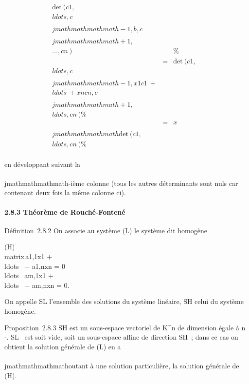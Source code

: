 \begin{align*}
\mathrm{det}~
(c1,\\ldots,c\\\\jmathmathmathmath-1,b,c\\\\jmathmathmathmath+1,\\\ldots,cn~)&&
\%& \\ & =&
\mathrm{det}~
(c1,\\ldots,c\\\\jmathmathmathmath-1,x1c1~
+ \\ldots~ +
xncn,c\\\\jmathmathmathmath+1,\\ldots,cn~)\%&
\\ & =&
x\\\\jmathmathmathmath \mathrm{det}~
(c1,\\ldots,cn~)
\%& \\ \end{align*}

en développant suivant la \\\\jmathmathmathmath-ième colonne (tous les autres déterminants
sont nuls car contenant deux fois la même colonne ci).

\paragraph{2.8.3 Théorème de Rouché-Fontené}

Définition~2.8.2 On associe au système (L) le système dit homogène

(H)\quad \left
\\matrix\,a1,1x1
+ \\ldots~ +
a1,nxn = 0 \cr
\\ldots~
\cr am,1x1 +
\\ldots~ +
am,nxn = 0\right .

On appelle SL l'ensemble des solutions du système linéaire,
SH celui du système homogène.

Proposition~2.8.3 SH est un sous-espace vectoriel de
K^n de dimension égale à n
-\mathrmrgL. SL~
est soit vide, soit un sous-espace affine de direction SH~;
dans ce cas on obtient la solution générale de (L) en a\\\\jmathmathmathmathoutant à une
solution particulière, la solution générale de (H).

